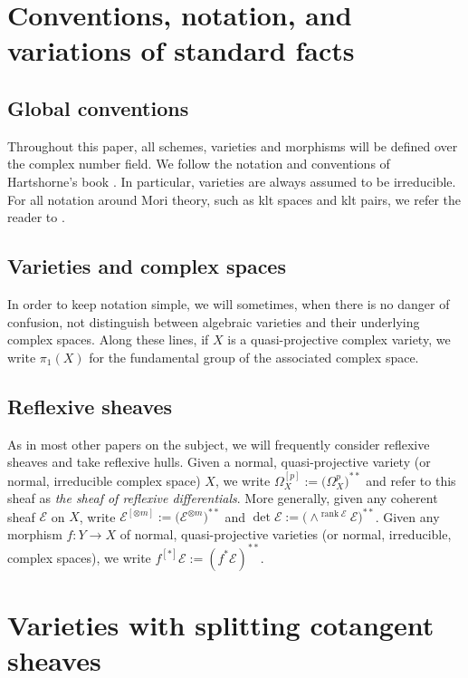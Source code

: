 \documentclass[11pt]{article}
\let\scr\mathscr
\theoremstyle{plain}
\theoremstyle{definition}
\numberwithin{equation}{thm}
\numberwithin{enumi}{thm}
\DeclareMathOperator{\rank}{rank}
\newcommand{\sE}{\scr{E}}
\begin{document}
\section{Conventions, notation, and variations of standard facts}

\subsection{Global conventions}

Throughout this paper, all schemes, varieties and morphisms will be defined over
the complex number field. We follow the notation and conventions of
Hartshorne's book \cite{Ha77}. In particular, varieties are always assumed to
be irreducible. For all notation around Mori theory, such as klt spaces and klt
pairs, we refer the reader to \cite{KM98}.

\subsection{Varieties and complex spaces}

In order to keep notation simple, we will sometimes, when there is no danger of
confusion, not distinguish between algebraic varieties and their underlying
complex spaces. Along these lines, if $X$ is a quasi-projective complex
variety, we write $\pi_1(X)$ for the fundamental group of the associated complex
space.

\subsection{Reflexive sheaves}

As in most other papers on the subject, we will frequently consider reflexive
sheaves and take reflexive hulls. Given a normal, quasi-projective variety (or
normal, irreducible complex space) $X$, we write
$\Omega^{[p]}_X := \bigl(\Omega^p_X \bigr)^{**}$ and refer to this sheaf as \emph{the
sheaf of reflexive differentials}. More generally, given any coherent sheaf
$\sE$ on $X$, write $\sE^{[\otimes m]} := \bigl(\sE^{\otimes m} \bigr)^{**}$ and
$\det \sE := \bigl(\wedge^{\rank \sE} \sE \bigr)^{**}$. Given any morphism $f : Y \to X$ of
normal, quasi-projective varieties (or normal, irreducible, complex spaces), we
write $f^{[*]} \sE := (f^* \sE)^{**}$.


\setcounter{section}{3}
\section{Varieties with splitting cotangent sheaves}
\label{sec:4}
\end{document}
